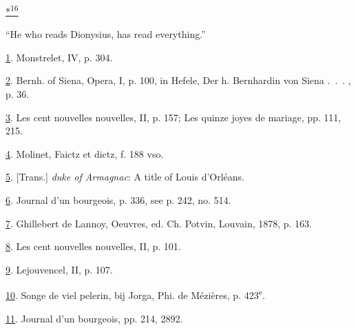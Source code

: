 \protect\hypertarget{23_NOTES.xhtmlux5cux23id_2328}{\protect\hyperlink{14_Chapter_Seven__THE_PIOUS_PERSONA.xhtmlux5cux23id_2327}{*\textsuperscript{16}}}
``He who reads Dionysius, has read everything.''

\protect\hypertarget{23_NOTES.xhtmlux5cux23id_1022}{\protect\hyperlink{14_Chapter_Seven__THE_PIOUS_PERSONA.xhtmlux5cux23id_1021}{1}}.
Monstrelet, IV, p. 304.

\protect\hypertarget{23_NOTES.xhtmlux5cux23id_1020}{\protect\hyperlink{14_Chapter_Seven__THE_PIOUS_PERSONA.xhtmlux5cux23id_1019}{2}}.
Bernh. of Siena, Opera, I, p. 100, in Hefele, Der h. Bernhardin von
Siena .~.~. , p. 36.

\protect\hypertarget{23_NOTES.xhtmlux5cux23id_1018}{\protect\hyperlink{14_Chapter_Seven__THE_PIOUS_PERSONA.xhtmlux5cux23id_1017}{3}}.
Les cent nouvelles nouvelles, II, p. 157; Les quinze joyes de mariage,
pp. 111, 215.

\protect\hypertarget{23_NOTES.xhtmlux5cux23id_1016}{\protect\hyperlink{14_Chapter_Seven__THE_PIOUS_PERSONA.xhtmlux5cux23id_1015}{4}}.
Molinet, Faictz et dictz, f. 188 vso.

\protect\hypertarget{23_NOTES.xhtmlux5cux23id_1014}{\protect\hyperlink{14_Chapter_Seven__THE_PIOUS_PERSONA.xhtmlux5cux23id_1013}{5}}.
{[}Trans.{]} \emph{duke of Armagnac}: A title of Louis d'Orléans.

\protect\hypertarget{23_NOTES.xhtmlux5cux23id_1012}{\protect\hyperlink{14_Chapter_Seven__THE_PIOUS_PERSONA.xhtmlux5cux23id_1011}{6}}.
Journal d'un bourgeois, p. 336, see p. 242, no. 514.

\protect\hypertarget{23_NOTES.xhtmlux5cux23id_1010}{\protect\hyperlink{14_Chapter_Seven__THE_PIOUS_PERSONA.xhtmlux5cux23id_1009}{7}}.
Ghillebert de Lannoy, Oeuvres, ed. Ch. Potvin, Louvain, 1878, p. 163.

\protect\hypertarget{23_NOTES.xhtmlux5cux23id_1008}{\protect\hyperlink{14_Chapter_Seven__THE_PIOUS_PERSONA.xhtmlux5cux23id_1007}{8}}.
Les cent nouvelles nouvelles, II, p. 101.

\protect\hypertarget{23_NOTES.xhtmlux5cux23id_1006}{\protect\hyperlink{14_Chapter_Seven__THE_PIOUS_PERSONA.xhtmlux5cux23id_1005}{9}}.
Lejouvencel, II, p. 107.

\protect\hypertarget{23_NOTES.xhtmlux5cux23page_421}{\protect\hyperlink{14_Chapter_Seven__THE_PIOUS_PERSONA.xhtmlux5cux23id_1004}{10}}.
Songe de viel pelerin, bij Jorga, Phi. de Mézières, p.
423\textsuperscript{e}.

\protect\hypertarget{23_NOTES.xhtmlux5cux23id_1003}{\protect\hyperlink{14_Chapter_Seven__THE_PIOUS_PERSONA.xhtmlux5cux23id_1002}{11}}.
Journal d'un bourgeois, pp. 214, 2892.

